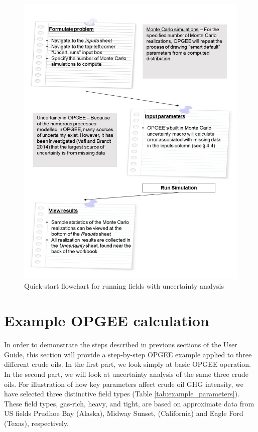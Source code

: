 \documentclass[11pt]{report}
\begin{document}
\begin{figure}[t]
\includegraphics[width=1\columnwidth]{documentation/images/User_Guide_figs/uncertainty.jpg}
\caption{Quick-start flowchart for running fields with uncertainty analysis}
\label{fig:uncertainty_flow}
\end{figure}

\clearpage

\section{Example OPGEE calculation} \label{sec:guided_example}

In order to demonstrate the steps described in previous sections of the User Guide, this section will provide a step-by-step OPGEE example applied to three different crude oils. In the first part, we look simply at basic OPGEE operation. In the second part, we will look at uncertainty analysis of the same three crude oils.
For illustration of how key parameters affect crude oil GHG intensity, we have selected three distinctive field types (Table \ref{tab:example_parameters}). These field types, gas-rich, heavy, and tight, are based on approximate data from US fields Prudhoe Bay (Alaska), Midway Sunset, (California) and Eagle Ford (Texas), respectively.
\end{document}
